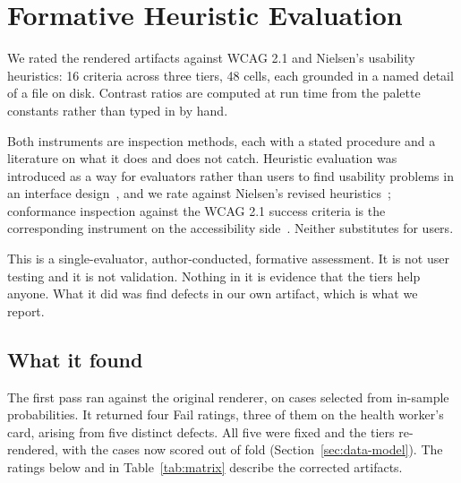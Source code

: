 \section{Formative Heuristic Evaluation}
\label{sec:eval}

We rated the rendered artifacts against WCAG 2.1 and Nielsen's usability
heuristics: 16 criteria across three tiers, 48 cells, each grounded in a
named detail of a file on disk. Contrast ratios are computed at run time from
the palette constants rather than typed in by hand.

Both instruments are inspection methods, each with a stated procedure and a
literature on what it does and does not catch. Heuristic evaluation was
introduced as a way for evaluators rather than users to find usability
problems in an interface design~\citep{nielsen1990heuristic}, and we rate
against Nielsen's revised heuristics~\citep{nielsen1994enhancing};
conformance inspection against the WCAG 2.1 success criteria is the
corresponding instrument on the accessibility side~\citep{w3c2025wcag21}.
Neither substitutes for users.

This is a single-evaluator, author-conducted, formative assessment. It is not
user testing and it is not validation. Nothing in it is evidence that the
tiers help anyone. What it did was find defects in our own artifact, which is
what we report.

\subsection{What it found}

The first pass ran against the original renderer, on cases selected from
in-sample probabilities. It returned four Fail ratings, three of them on the
health worker's card, arising from five distinct defects. All five were fixed
and the tiers re-rendered, with the cases now scored out of fold
(Section~\ref{sec:data-model}). The ratings below and in
Table~\ref{tab:matrix} describe the corrected artifacts.

